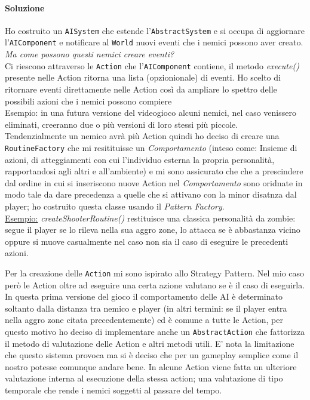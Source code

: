 \documentclass[a4paper,12pt]{report}
\begin{document}
\paragraph{Soluzione}
Ho costruito un \texttt{AISystem} che estende l'\texttt{AbstractSystem} e si occupa di aggiornare
l'\texttt{AIComponent} e notificare al \texttt{World} nuovi eventi che i nemici possono aver creato.\\

\textit{Ma come possono questi nemici creare eventi?}\\
Ci riescono attraverso le \texttt{Action} che l'\texttt{AIComponent} contiene, il metodo \textit{execute()} presente
nelle Action ritorna una lista (opzionionale) di eventi.
Ho scelto di ritornare eventi direttamente nelle Action così da ampliare lo spettro delle
possibili azioni che i nemici possono compiere\\

Esempio: in una futura versione del videogioco alcuni nemici, nel caso venissero eliminati,
creeranno due o più versioni di loro stessi più piccole.\\

Tendenzialmente un nemico avrà più Action quindi ho deciso di creare una \texttt{RoutineFactory} che mi
resitituisse un \textit{Comportamento} (inteso come: Insieme di azioni,
di atteggiamenti con cui l'individuo esterna la propria personalità, rapportandosi
agli altri e all'ambiente) e mi sono assicurato che che
a prescindere dal ordine in cui si inseriscono nuove Action nel \textit{Comportamento}
sono oridnate in modo tale da dare precedenza a quelle che si attivano con la minor disatnza dal
player; ho costruito questa classe usando il \textit{Pattern Factory}. \\

\underline{Esempio:} \textit{createShooterRoutine()} restituisce una classica personalità da zombie:
segue il player se lo rileva nella sua aggro zone, lo attacca se è abbastanza vicino oppure si muove
casualmente nel caso non sia il caso di eseguire le precedenti azioni.

Per la creazione delle \texttt{Action} mi sono ispirato allo Strategy Pattern.
Nel mio caso però le Action oltre ad eseguire una certa azione valutano se è il caso di eseguirla.
In questa prima versione del gioco il comportamento delle AI è determinato soltanto
dalla distanza tra nemico e player (in altri termini: se il player entra nella
aggro zone citata precedentemente) ed è comune a tutte le Action, per questo motivo ho deciso di
implementare anche un \texttt{AbstractAction} che fattorizza il metodo di valutazione
delle Action e altri metodi utili.
E' nota la limitazione che questo sistema provoca ma si è deciso che per un gameplay semplice come il nostro
potesse comunque andare bene. In alcune Action viene fatta un ulteriore valutazione
interna al esecuzione della stessa action; una valutazione di tipo temporale che rende
i nemici soggetti al passare del tempo.\\
\end{document}
